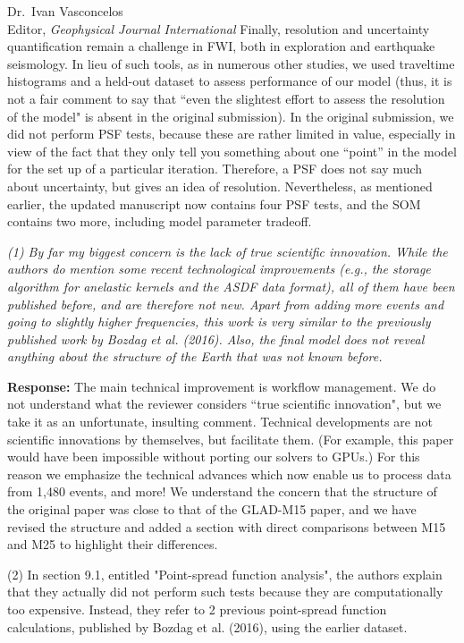\documentclass[11pt,a4paper]{letter}
\newcommand{\response}[1]{\textbf{Response:} #1}
\newcommand{\rev}[1]{{\it{#1}}}
\begin{document}
\begin{letter}{Dr.~Ivan Vasconcelos\\
Editor, \textit{Geophysical Journal International}}
{Finally, resolution and uncertainty quantification remain a challenge in FWI,
both in exploration and earthquake seismology.
In lieu of such tools,
as in numerous other studies,
we used traveltime histograms and a held-out dataset to assess performance of our model (thus, it is not a fair comment to say that ``even the slightest effort to assess the resolution of the model" is absent in the original submission).
In the original submission, we did not perform PSF tests, because these are rather limited in value, especially in view of the fact that they only tell you something about one ``point'' in the model for the set up of a particular iteration.
Therefore, a PSF does not say much about uncertainty, but gives an idea of resolution.
Nevertheless,
as mentioned earlier,
the updated manuscript now contains four PSF tests,
and the SOM contains two more,
including model parameter tradeoff.}


\rev{(1) By far my biggest concern is the lack of true scientific innovation. While the authors do mention some recent technological improvements (e.g., the storage algorithm for anelastic kernels and the ASDF data format), all of them have been published before, and are therefore not new. Apart from adding more events and going to slightly higher frequencies, this work is very similar to the previously published work by Bozdag et al. (2016). Also, the final model does not reveal anything about the structure of the Earth that was not known before.
}

\response{The main technical improvement is workflow management. We do not understand what the reviewer considers ``true scientific innovation", but we take it as an unfortunate, insulting comment. Technical developments are not scientific innovations by themselves, but facilitate them. (For example, this paper would have been impossible without porting our solvers to GPUs.) For this reason we emphasize the technical advances which now enable us to process data from 1,480 events, and more! We understand the concern that the structure of the original paper was close to that of the GLAD-M15 paper,
and we have revised the structure and added a section with direct comparisons between M15 and M25 to highlight their  differences.
}


\rev{(2) In section 9.1, entitled "Point-spread function analysis", the authors explain that they actually did not perform such tests because they are computationally too expensive. Instead, they refer to 2 previous point-spread function calculations, published by Bozdag et al. (2016), using the earlier dataset. 

}
\end{letter}
\end{document}

